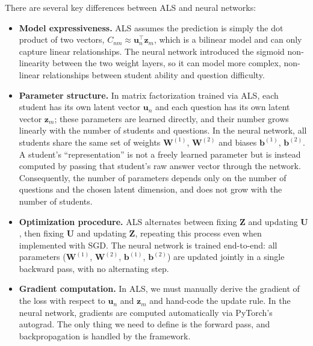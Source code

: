 \documentclass[11pt, letterpaper]{article}
\begin{document}
There are several key differences between ALS and neural networks:
\begin{itemize}
    \item \textbf{Model expressiveness.} 
    ALS assumes the prediction is simply the dot product of two vectors, $C_{nm} \approx \mathbf{u}_n^\top \mathbf{z}_m$, which is a bilinear model and can only capture linear relationships. The neural network introduced the sigmoid non-linearity between the two weight layers, so it can model more complex, non-linear relationships between student ability and question difficulty.

    \item \textbf{Parameter structure.} 
    In matrix factorization trained via ALS, each student has its own latent vector $\mathbf{u}_n$ and each question has its own latent vector $\mathbf{z}_m$; these parameters are learned directly, and their number grows linearly with the number of students and questions. In the neural network, all students share the same set of weights $\mathbf{W}^{(1)}$, $\mathbf{W}^{(2)}$  and biases $\mathbf{b}^{(1)}$, $\mathbf{b}^{(2)}$. A student's ``representation'' is not a freely learned parameter but is instead computed by passing that student's raw answer vector through the network. Consequently, the number of parameters depends only on the number of questions and the chosen latent dimension, and does not grow with the number of students.

    \item \textbf{Optimization procedure.}
    ALS alternates between fixing $\mathbf{Z}$ and updating $\mathbf{U}$, then fixing $\mathbf{U}$ and updating $\mathbf{Z}$, repeating this process even when implemented with SGD. The neural network is trained end-to-end: all parameters ($\mathbf{W}^{(1)}$, $\mathbf{W}^{(2)}$, $\mathbf{b}^{(1)}$, $\mathbf{b}^{(2)}$) are updated jointly in a single backward pass, with no alternating step.

    \item \textbf{Gradient computation.}
    In ALS, we must manually derive the gradient of the loss with respect to $\mathbf{u}_n$ and $\mathbf{z}_m$ and hand-code the update rule. In the neural network, gradients are computed automatically via PyTorch's autograd. The only thing we need to define is the forward pass, and backpropagation is handled by the framework.
\end{itemize}

\end{document}
